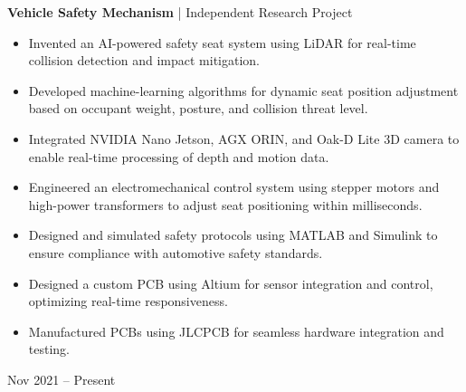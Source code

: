 \documentclass[10pt, letterpaper]{article}
\newenvironment{highlights}{
    \begin{itemize}[
        topsep=0.10 cm,
        parsep=0.10 cm,
        partopsep=0pt,
        itemsep=0pt,
        leftmargin=0.4 cm + 10pt
    ]
}{
    \end{itemize}
} %
\newenvironment{twocolentry}[2][]{
    \onecolentry
    \def\secondColumn{#2}
    \setcolumnwidth{\fill, 4.5 cm}
    \begin{paracol}{2}
}{
    \switchcolumn \raggedleft \secondColumn
    \end{paracol}
    \endonecolentry
} %
\begin{document}
        \vspace{0.2 cm} %

        \begin{twocolentry}{Nov 2021 – Present}
        \textbf{Vehicle Safety Mechanism} | Independent Research Project
        \begin{highlights}
        \item Invented an AI-powered safety seat system using LiDAR for real-time collision detection and impact mitigation.
        \item Developed machine-learning algorithms for dynamic seat position adjustment based on occupant weight, posture, and collision threat level.
        \item Integrated NVIDIA Nano Jetson, AGX ORIN, and Oak-D Lite 3D camera to enable real-time processing of depth and motion data.
        \item Engineered an electromechanical control system using stepper motors and high-power transformers to adjust seat positioning within milliseconds.
        \item Designed and simulated safety protocols using MATLAB and Simulink to ensure compliance with automotive safety standards.
        \item Designed a custom PCB using Altium for sensor integration and control, optimizing real-time responsiveness.
        \item Manufactured PCBs using JLCPCB for seamless hardware integration and testing.
        \end{highlights}
        \end{twocolentry}

        \vspace{0.2 cm} %
        
\end{document}
